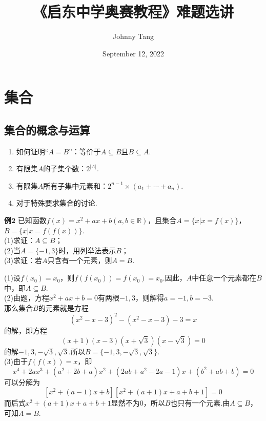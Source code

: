 \documentclass[lang=cn, zihao=4.5]{elegantbook}
\title{《启东中学奥赛教程》难题选讲}
\author{Johnny Tang}
\institute{Chengdu Jiaxiang Foreign Languages School}
\date{September 12, 2022}
\begin{document}
\maketitle

\frontmatter

\mainmatter

\tableofcontents

\newpage

\chapter{集合}

\section{集合的概念与运算}

\begin{enumerate}
	\item 如何证明“$A=B$”：等价于$A \subseteq B$且$B \subseteq A$.
	\item 有限集$A$的子集个数：$2^{|A|}$.
	\item 有限集$A$所有子集中元素和：$2^{n-1} \times (a_1+ \cdots +a_n)$.
	\item 对于特殊要求集合的讨论.
\end{enumerate}

\newpage
\noindent %
	\textbf{例2} \quad 已知函数$f(x)=x^2+ax+b(a,b \in \mathbb{R})$，且集合$A=\{x|x=f(x)\}$，$B=\{x|x=f(f(x))\}$. \\
	(1)求证：$A \subseteq B$；\\
	(2)当$A=\{-1,3\}$时，用列举法表示$B$；\\
	(3)求证：若$A$只含有一个元素，则$A=B$. 
	
\begin{solution}
	(1)设$f(x_0)=x_0$，则$f(f(x_0))=f(x_0)=x_0$.因此，$A$中任意一个元素都在$B$中，即$A \subseteq B$. \\
	(2)由题，方程$x^2+ax+b=0$有两根$-1,3$，则解得$a=-1,b=-3$. \\
	那么集合$B$的元素就是方程$$(x^2-x-3)^2 - (x^2-x-3) - 3 = x$$
	的解，即方程$$(x+1)(x-3)(x+\sqrt{3})(x-\sqrt{3}) = 0$$
	的解$-1,3,-\sqrt{3},\sqrt{3}$.所以$B=\{ -1,3,-\sqrt{3},\sqrt{3} \}$. \\
	(3)由于$f(f(x))=x$，即$$x^4 + 2ax^3 + (a^2+2b+a)x^2 + (2ab+a^2-2a-1)x + (b^2+ab+b) = 0$$
	可以分解为$$[x^2 + (a-1)x + b] [x^2 + (a+1)x +a+b+1] = 0$$
	而后式$x^2 + (a+1)x +a+b+1$显然不为$0$，所以$B$也只有一个元素.由$A \subseteq B$，可知$A=B$.
\end{solution}
	
\end{document}
